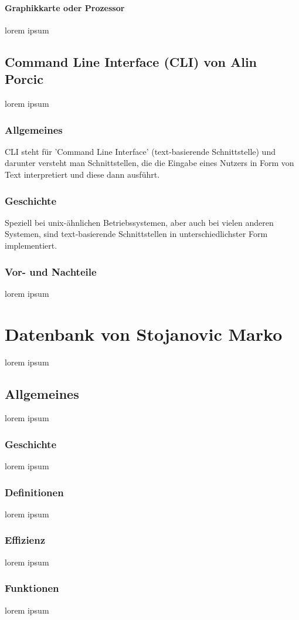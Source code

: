 \documentclass[12pt,a4paper]{report}
\begin{document}
\paragraph{Graphikkarte oder Prozessor}
lorem ipsum
\subsection{Command Line Interface (CLI) von Alin Porcic}
lorem ipsum
\subsubsection{Allgemeines}

CLI steht für 'Command Line Interface' (text-basierende Schnittstelle) und darunter versteht man Schnittstellen, die die Eingabe eines Nutzers in Form von Text interpretiert und diese dann ausführt.

\subsubsection{Geschichte}

Speziell bei unix-ähnlichen Betriebssystemen, aber auch bei vielen anderen Systemen, sind text-basierende Schnittstellen in unterschiedlichster Form implementiert.

\subsubsection{Vor- und Nachteile}
lorem ipsum
\section{Datenbank von Stojanovic Marko}
lorem ipsum
\subsection{Allgemeines}
lorem ipsum
\subsubsection{Geschichte}
lorem ipsum
\subsubsection{Definitionen}
lorem ipsum
\subsubsection{Effizienz}
lorem ipsum
\subsubsection{Funktionen}
lorem ipsum
\end{document}
